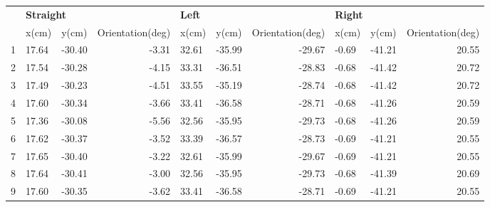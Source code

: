 \begin{table}[]
\centering
\begin{tabular}{|l|l|l|r|l|l|r|l|l|r|}
\hline
                           & \multicolumn{3}{l|}{\textbf{Straight}} & \multicolumn{3}{l|}{\textbf{Left}} & \multicolumn{3}{l|}{\textbf{Right}} \\ \cline{2-10} 
\multirow{-2}{*}{\textbf{}} & x(cm)           & y(cm)            & Orientation(deg)          & x(cm)  & y(cm)  & Orientation(deg) & x(cm)  & y(cm)   & Orientation(deg) \\ \hline
1                                                   & 17.64           & -30.40           & -3.31                     & 32.61  & -35.99 & -29.67           & -0.69  & -41.21  & 20.55            \\ \hline
2                                                   & 17.54           & -30.28           & -4.15                     & 33.31  & -36.51 & -28.83           & -0.68  & -41.42  & 20.72            \\ \hline
3                                                   & 17.49           & -30.23           & -4.51                     & 33.55  & -35.19 & -28.74           & -0.68  & -41.42  & 20.72            \\ \hline
4                                                   & 17.60           & -30.34           & -3.66                     & 33.41  & -36.58 & -28.71           & -0.68  & -41.26  & 20.59            \\ \hline
5                                                   & 17.36           & -30.08           & -5.56                     & 32.56  & -35.95 & -29.73           & -0.68  & -41.26  & 20.59            \\ \hline
6                                                   & 17.62           & -30.37           & -3.52                     & 33.39  & -36.57 & -28.73           & -0.69  & -41.21  & 20.55            \\ \hline
7                                                   & 17.65           & -30.40           & -3.22                     & 32.61  & -35.99 & -29.67           & -0.69  & -41.21  & 20.55            \\ \hline
8                                                   & 17.64           & -30.41           & -3.00                     & 32.56  & -35.95 & -29.73           & -0.68  & -41.39  & 20.69            \\ \hline
9                                                   & 17.60           & -30.35           & -3.62                     & 33.41  & -36.58 & -28.71           & -0.69  & -41.21  & 20.55            \\ \hline

\end{tabular}
\end{table}
